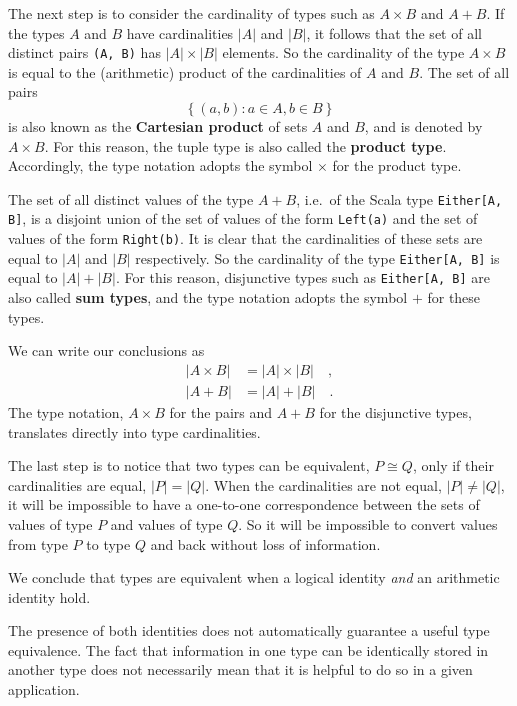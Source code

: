 The next step is to consider the cardinality of types such as $A\times B$
and $A+B$. If the types $A$ and $B$ have cardinalities $\left|A\right|$
and $\left|B\right|$, it follows that the set of all distinct pairs
\lstinline!(A, B)! has $\left|A\right|\times\left|B\right|$ elements.
So the cardinality of the type $A\times B$ is equal to the (arithmetic)
product of the cardinalities of $A$ and $B$. The set of all pairs
\[
\left\{ (a,b):a\in A,b\in B\right\} 
\]
is also known as the \textbf{Cartesian product}
of sets $A$ and $B$, and is denoted by $A\times B$. For this reason,
the tuple type is also called the \textbf{product
type}. Accordingly, the type notation adopts the symbol $\times$
for the product type.

The set of all distinct values of the type $A+B$, i.e.~of the Scala
type \lstinline!Either[A, B]!, is a disjoint union of the set of
values of the form \lstinline!Left(a)! and the set of values of the
form \lstinline!Right(b)!. It is clear that the cardinalities of
these sets are equal to $\left|A\right|$ and $\left|B\right|$ respectively.
So the cardinality of the type \lstinline!Either[A, B]! is equal
to $\left|A\right|+\left|B\right|$. For this reason, disjunctive
types such as \lstinline!Either[A, B]! are also called \textbf{sum
types}, and the type notation adopts the symbol $+$ for these types.

We can write our conclusions as
\begin{align*}
\left|A\times B\right| & =\left|A\right|\times\left|B\right|\quad,\\
\left|A+B\right| & =\left|A\right|+\left|B\right|\quad.
\end{align*}
The type notation, $A\times B$ for the pairs and $A+B$ for the disjunctive
types, translates directly into type cardinalities.

The last step is to notice that two types can be equivalent, $P\cong Q$,
only if their cardinalities are equal, $\left|P\right|=\left|Q\right|$.
When the cardinalities are not equal, $\left|P\right|\neq\left|Q\right|$,
it will be impossible to have a one-to-one correspondence between
the sets of values of type $P$ and values of type $Q$. So it will
be impossible to convert values from type $P$ to type $Q$ and back
without loss of information.

We conclude that types are equivalent when a logical identity \emph{and}
an arithmetic identity hold.

The presence of both identities does not automatically guarantee a
useful type equivalence. The fact that information in one type can
be identically stored in another type does not necessarily mean that
it is helpful to do so in a given application.

